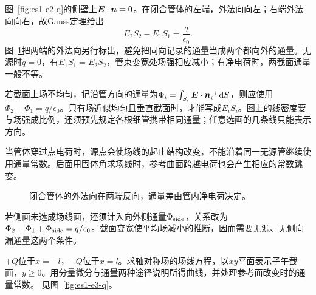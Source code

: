 \begin{solution}
图~\ref{fig:es1-e2-q}的侧壁上$\bm{E}\cdot\bm{n}=0$。在闭合管体的左端，外法向向左；右端外法向向右，故Gauss定理给出
\[\boxed{E_2S_2-E_1S_1=\frac q{\epsilon_0}}.\]
图~\ref{fig:es1-e2-s}把两端的外法向另行标出，避免把同向记录的通量当成两个都向外的通量。无源时$q=0$，有$E_1S_1=E_2S_2$，管束变宽处场强相应减小；有净电荷时，两截面通量一般不等。

若截面上场不均匀，记沿管方向的通量为$\Phi_i=\int_{S_i}\bm{E}\cdot\bm{n}_i^{\rightarrow}\mathop{}\!\mathrm d S$，则应使用$\Phi_2-\Phi_1=q/\epsilon_0$。只有场近似均匀且垂直截面时，才能写成$E_iS_i$。图上的线密度要与场强成比例，还须预先规定各根细管携带相同通量；任意选画的几条线只能表示方向。

当管体穿过点电荷时，源点会使场线的起止结构改变，不能沿着同一无源管继续使用通量常数。后面用固体角求场线时，参考曲面跨越电荷也会产生相应的常数跳变。
\begin{figure}[H]\centering
{}
\caption{闭合管体的外法向在两端反向，通量差由管内净电荷决定。}\label{fig:es1-e2-s}
\end{figure}


若侧面未选成场线面，还须计入向外侧通量$\Phi_{\rm side}$，关系改为$\Phi_2-\Phi_1+\Phi_{\rm side}=q/\epsilon_0$。截面变宽使平均场减小的推断，因而需要无源、无侧向漏通量这两个条件。
\end{solution}

\begin{example}[两个异号点电荷的场线]\label{ex:es1-e3}
$+Q$位于$x=-l$，$-Q$位于$x=l$。求轴对称场的场线方程，以$xy$平面表示子午截面，$y\ge0$。用分量微分与通量两种途径说明所得曲线，并处理参考面改变时的通量常数。 见图~\ref{fig:es1-e3-q}。
\end{example}

